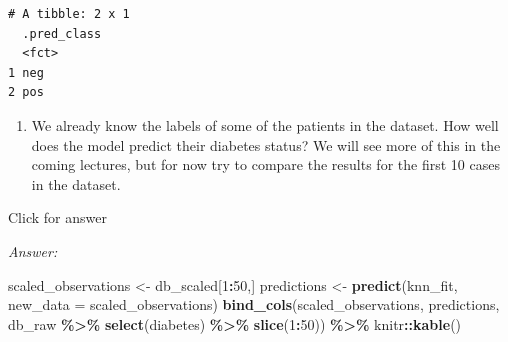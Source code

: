 \documentclass[
]{book}
\newenvironment{Shaded}{\begin{snugshade}}{\end{snugshade}}
\newcommand{\AttributeTok}[1]{\textcolor[rgb]{0.13,0.29,0.53}{#1}}
\newcommand{\DecValTok}[1]{\textcolor[rgb]{0.00,0.00,0.81}{#1}}
\newcommand{\FunctionTok}[1]{\textcolor[rgb]{0.13,0.29,0.53}{\textbf{#1}}}
\newcommand{\NormalTok}[1]{#1}
\newcommand{\OtherTok}[1]{\textcolor[rgb]{0.56,0.35,0.01}{#1}}
\newcommand{\SpecialCharTok}[1]{\textcolor[rgb]{0.81,0.36,0.00}{\textbf{#1}}}
\providecommand{\tightlist}{%
  \setlength{\itemsep}{0pt}\setlength{\parskip}{0pt}}
\begin{document}
\begin{verbatim}
# A tibble: 2 x 1
  .pred_class
  <fct>      
1 neg        
2 pos        
\end{verbatim}

\begin{enumerate}
\def\labelenumi{\alph{enumi}.}
\setcounter{enumi}{1}
\tightlist
\item
  We already know the labels of some of the patients in the dataset. How well does the model predict their diabetes status? We will see more of this in the coming lectures, but for now try to compare the results for the first 10 cases in the dataset.
\end{enumerate}

Click for answer

\emph{Answer:}

\begin{Shaded}
\begin{Highlighting}[]
\NormalTok{scaled\_observations }\OtherTok{\textless{}{-}}\NormalTok{ db\_scaled[}\DecValTok{1}\SpecialCharTok{:}\DecValTok{50}\NormalTok{,]}
\NormalTok{predictions }\OtherTok{\textless{}{-}} \FunctionTok{predict}\NormalTok{(knn\_fit, }\AttributeTok{new\_data =}\NormalTok{ scaled\_observations)}
\FunctionTok{bind\_cols}\NormalTok{(scaled\_observations, predictions, db\_raw }\SpecialCharTok{\%\textgreater{}\%} 
            \FunctionTok{select}\NormalTok{(diabetes) }\SpecialCharTok{\%\textgreater{}\%} 
            \FunctionTok{slice}\NormalTok{(}\DecValTok{1}\SpecialCharTok{:}\DecValTok{50}\NormalTok{)) }\SpecialCharTok{\%\textgreater{}\%}\NormalTok{ knitr}\SpecialCharTok{::}\FunctionTok{kable}\NormalTok{()}
\end{Highlighting}
\end{Shaded}
\end{document}
